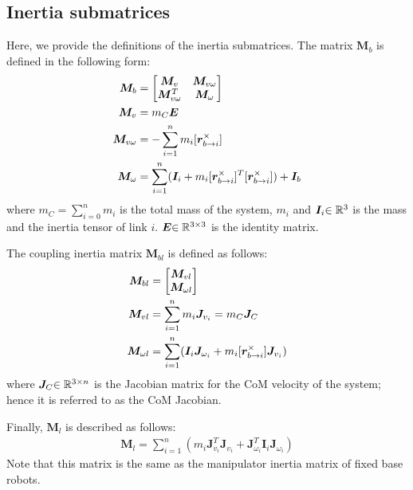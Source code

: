 \subsection{Inertia submatrices}
Here, we provide the definitions of the inertia submatrices.
The matrix $\bm{M}_{b}$ is defined in the following form:
%
\begin{align}
  \bm{M}_{b} &= {\begin{bmatrix} \bm{M}_{v} & \bm{M}_{v\omega} \\ \bm{M}_{v\omega}^{T} & \bm{M}_{\omega} \end{bmatrix}}\\
  \bm{M}_{v} &= m_{C}\bm{E}\\
  \bm{M}_{v\omega} &= -\sum_{i=1}^{n}m_{i}[\bm{r}_{b \rightarrow i}^{\times}]\\
  \bm{M}_{\omega} &= \sum_{i=1}^{n}(\bm{I}_{i} + m_{i}[\bm{r}_{b \rightarrow i}^{\times}]^{T}[\bm{r}_{b \rightarrow i}^{\times}]) + \bm{I}_{b}
\end{align}
%
where $m_{C} = \sum_{i=0}^{n}m_{i}$ is the total mass of the system,
$m_{i}$ and $\bm{I}_{i}{\in\mathbb{R}^{3}}$ is the mass and the inertia tensor of link $i$.
$\bm{E}{\in\mathbb{R}^{3 \times 3}}$ is the identity matrix.

The coupling inertia matrix $\bm{M}_{bl}$ is defined as follows:
%
\begin{align}
  \bm{M}_{bl} &= {\begin{bmatrix} \bm{M}_{vl} \\ \bm{M}_{\omega l} \end{bmatrix}}\\
  \bm{M}_{vl} &= \sum_{i = 1}^{n}m_{i}\bm{J}_{v_{i}} = m_{C}\bm{J}_{C}\\
  \bm{M}_{\omega l} &= \sum_{i = 1}^{n}(\bm{I}_{i}\bm{J}_{\omega_{i} } + m_{i}[\bm{r}_{b \rightarrow i}^{\times}]\bm{J}_{v_{i}})
\end{align}
%
where $\bm{J}_{C}{\in\mathbb{R}^{3\times n}}$ is the Jacobian matrix for the CoM velocity of the system;
hence it is referred to as the CoM Jacobian.

Finally, $\bm{M}_{l}$ is described as follows:
%
\begin{align}
  \bm{M}_{l} = \sum_{i=1}^{n}(m_{i}\bm{J}_{v_{i}}^{T}\bm{J}_{v_{i}} + \bm{J}_{\omega_{i}}^{T}\bm{I}_{i}\bm{J}_{\omega_{i}})
\end{align}
%
Note that this matrix is the same as the manipulator inertia matrix of fixed base robots.


